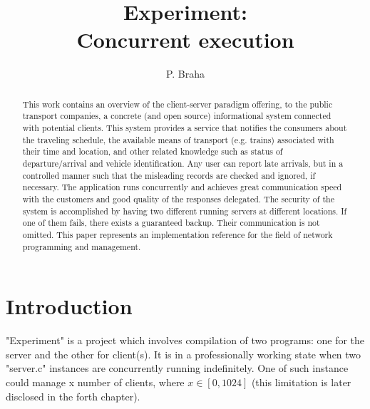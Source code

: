 \documentclass[runningheads]{llncs}
\begin{document}
\title{Experiment: \\ Concurrent execution}

\author{P. Braha}

\maketitle

\begin{abstract} This work contains an overview of the client-server paradigm offering, to the public transport companies, a concrete (and open source) informational system connected with potential clients. This system provides a service that notifies the consumers about the traveling schedule, the available means of transport (e.g. trains) associated with their time and location, and other related knowledge such as status of departure/arrival and vehicle identification. Any user can report late arrivals, but in a controlled manner such that the misleading records are checked and ignored, if necessary. The application runs concurrently and achieves great communication speed with the customers and good quality of the responses delegated. The security of the system is accomplished by having two different running servers at different locations. If one of them fails, there exists a guaranteed backup. Their communication is not omitted. This paper represents an implementation reference for the field of network programming and management.

\end{abstract}


\section{Introduction}

"Experiment" is a project which involves compilation of two programs: one for the server and the other for client(s). It is in a professionally working state when two "server.c" instances are concurrently running indefinitely. One of such instance could manage x number of clients, where $x \in \left[0, 1024\right]$ (this limitation is later disclosed in the forth chapter). 
\end{document}
